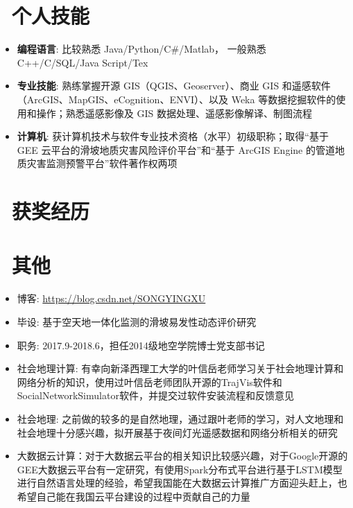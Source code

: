 \documentclass{resume}
\begin{document}
\section{\faCogs\ 个人技能}
\begin{itemize}[parsep=0.25ex]
  \item \textbf{编程语言}:
    比较熟悉 Java/Python/C\#/Matlab，
    一般熟悉 C++/C/SQL/Java Script/Tex
  
  \item \textbf{专业技能}:
  熟练掌握开源 GIS（QGIS、Geoserver）、商业 GIS 和遥感软件（ArcGIS、MapGIS、eCognition、ENVI）、以及 Weka 等数据挖掘软件的使用和操作；熟悉遥感影像及 GIS 数据处理、遥感影像解译、制图流程

  \item \textbf{计算机}:
  获计算机技术与软件专业技术资格（水平）初级职称；取得“基于 GEE 云平台的滑坡地质灾害风险评价平台”和“基于 ArcGIS Engine 的管道地质灾害监测预警平台”软件著作权两项

\end{itemize}

\section{\faHeartO\ 获奖经历}

\section{\faInfo\ 其他}
\begin{itemize}[parsep=0.25ex]
  \item 博客: \url{https://blog.csdn.net/SONGYINGXU} 
  \item 毕设: 基于空天地一体化监测的滑坡易发性动态评价研究
  \item 职务: 2017.9-2018.6，担任2014级地空学院博士党支部书记
  \item 社会地理计算: 有幸向新泽西理工大学的叶信岳老师学习关于社会地理计算和网络分析的知识，使用过叶信岳老师团队开源的TrajVis软件和SocialNetworkSimulator软件，并提交过软件安装流程和反馈意见
  \item 社会地理: 之前做的较多的是自然地理，通过跟叶老师的学习，对人文地理和社会地理十分感兴趣，拟开展基于夜间灯光遥感数据和网络分析相关的研究
  \item 大数据云计算：对于大数据云平台的相关知识比较感兴趣，对于Google开源的GEE大数据云平台有一定研究，有使用Spark分布式平台进行基于LSTM模型进行自然语言处理的经验，希望我国能在大数据云计算推广方面迎头赶上，也希望自己能在我国云平台建设的过程中贡献自己的力量
\end{itemize}

%
%
\end{document}
